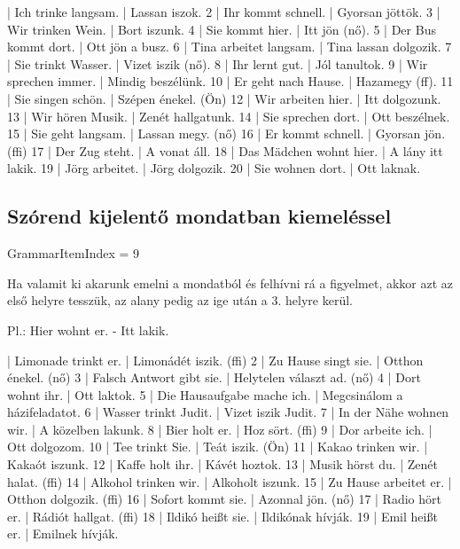 \documentclass{article}
\newenvironment{desc}{\verbatim}{\endverbatim}
\newenvironment{exmp}{\verbatim}{\endverbatim}
\begin{document}
\begin{exmp}
1 | Ich trinke langsam. | Lassan iszok.
2 | Ihr kommt schnell. | Gyorsan jöttök.
3 | Wir trinken Wein. | Bort iszunk.
4 | Sie kommt hier. | Itt jön (nő).
5 | Der Bus kommt dort. | Ott jön a busz.
6 | Tina arbeitet langsam. | Tina lassan dolgozik.
7 | Sie trinkt Wasser. | Vizet iszik (nő).
8 | Ihr lernt gut. | Jól tanultok.
9 | Wir sprechen immer. | Mindig beszélünk.
10 | Er geht nach Hause. | Hazamegy (ff).
11 | Sie singen schön. | Szépen énekel. (Ön)
12 | Wir arbeiten hier. | Itt dolgozunk.
13 | Wir hören Musik. | Zenét hallgatunk.
14 | Sie sprechen dort. | Ott beszélnek.
15 | Sie geht langsam. | Lassan megy. (nő)
16 | Er kommt schnell. | Gyorsan jön. (ffi)
17 | Der Zug steht. | A vonat áll.
18 | Das Mädchen wohnt hier. | A lány itt lakik.
19 | Jörg arbeitet. | Jörg dolgozik.
20 | Sie wohnen dort. | Ott laknak.
\end{exmp}

\subsection{Szórend kijelentő mondatban kiemeléssel}

GrammarItemIndex = 9

\begin{desc}
Ha valamit ki akarunk emelni a mondatból és felhívni rá a figyelmet,
akkor azt az első helyre tesszük, az alany pedig az ige után a 3. helyre kerül.

Pl.: Hier wohnt er. - Itt lakik.
\end{desc}

\begin{exmp}
1 | Limonade trinkt er. | Limonádét iszik. (ffi)
2 | Zu Hause singt sie. | Otthon énekel. (nő)
3 | Falsch Antwort gibt sie. | Helytelen választ ad. (nő)
4 | Dort wohnt ihr. | Ott laktok.
5 | Die Hausaufgabe mache ich. | Megcsinálom a házifeladatot.
6 | Wasser trinkt Judit. | Vizet iszik Judit.
7 | In der Nähe wohnen wir. | A közelben lakunk.
8 | Bier holt er. | Hoz sört. (ffi)
9 | Dor arbeite ich. | Ott dolgozom.
10 | Tee trinkt Sie. | Teát iszik. (Ön)
11 | Kakao trinken wir. | Kakaót iszunk.
12 | Kaffe holt ihr. | Kávét hoztok.
13 | Musik hörst du. | Zenét halat. (ffi)
14 | Alkohol trinken wir. | Alkoholt iszunk.
15 | Zu Hause arbeitet er. | Otthon dolgozik. (ffi)
16 | Sofort kommt sie. | Azonnal jön. (nő)
17 | Radio hört er. | Rádiót hallgat. (ffi)
18 | Ildikó heißt sie. | Ildikónak hívják.
19 | Emil heißt er. | Emilnek hívják.
\end{exmp}
\end{document}

